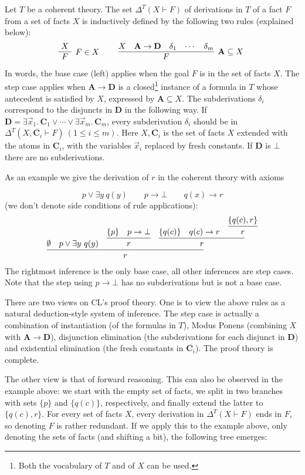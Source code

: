 \documentclass[12pt]{article}
\newcommand{\ra}{\rightarrow}
\newcommand{\set}[1]{\{#1\}}
\newcommand{\cl}[1]{\overline{#1}}
\begin{document}
Let $T$ be a coherent theory.
The set $\Delta^T(X\vdash F)$ of derivations in $T$ of a fact $F$
from a set of facts $X$ is inductively defined by the following two rules (explained below): 
\begin{eqnarray*}
  \mbox{\infer[F\in X]{~F~}{~X\vphantom{\delta_1}~}}
  \quad\quad
  \mbox{
    \infer[\mathbf{A}\subseteq X]{F}{
      X & \mathbf{A}\ra \mathbf{D}\quad\delta_1 & \cdots\quad\delta_m%
    }
  }
\end{eqnarray*}
In words, the base case (left) applies when the goal $F$ is in the set of facts $X$.
The step case applies when $\mathbf{A}\ra \mathbf{D}$
is a closed\footnote{Both the vocabulary of $T$ and of $X$ can be used.}
instance of a formula in $T$ whose antecedent
is satisfied by $X$, expressed by $\mathbf{A}\subseteq X$. 
The subderivations $\delta_i$ correspond to the disjuncts in $\mathbf{D}$
in the following way. If $\mathbf{D}=
{\exists \vec{x}_1.\,\mathbf{C}_{1} \vee \cdots \vee \exists \vec{x}_m.\,\mathbf{C}_{m}}$,
every subderivation $\delta_i$ should be in $\Delta^T(X,\cl{\mathbf{C}_{i}}\vdash F)
~(1\leq i\leq m)$. Here $X,\cl{\mathbf{C}_{i}}$ is the set of facts $X$
extended with the atoms in $\mathbf{C}_{i}$, with the variables $\vec{x}_i$
replaced by fresh constants.
If $\mathbf{D}$ is $\bot$ there are no subderivations.  

As an example we give the derivation of $r$ in the coherent theory with axioms

\[ p\vee\exists y~q(y) \quad\quad p\ra\bot \quad\quad q(x)\ra r\] 
(we don't denote side conditions of rule applications):
\[
\infer{r\vphantom{|}}
{\emptyset & p\vee \exists y~q(y) & \infer{r\vphantom{|}}{\set{p} & p\ra\bot} & \infer{r\vphantom{|}}
 {\set{q(c)} & q(c)\ra r & \infer{r\vphantom{|}}
  {\set{q(c),r}
  }
 }
}
\]
The rightmost inference is the only base case, all other
inferences are step cases. Note that the step using $p\ra\bot$
has no subderivations but is not a base case.

There are two views on CL's proof theory.
One is to view the above rules as a 
natural deduction-style system of inference.
The step case is actually a combination of
instantiation (of the formulas in $T$), Modus Ponens (combining $X$
with $\mathbf{A}\ra \mathbf{D}$), disjunction elimination 
(the subderivations for each disjunct in $\mathbf{D}$)
and existential elimination (the fresh constants in $\cl{\mathbf{C}_i}$).
The proof theory is complete.

The other view is that of forward reasoning.
This can also be observed in the example above: 
we start with the empty set of facts, we split in
two branches with sets $\set{p}$ and $\set{q(c)}$, respectively,
and finally extend the latter to $\set{q(c),r}$. 
For every set of facts $X$, every derivation in $\Delta^T(X\vdash F)$
ends in $F$, so denoting $F$ is rather redundant.
If we apply this to the example above, only denoting the sets of
facts (and shifting a bit), the following tree emerges:
\end{document}
